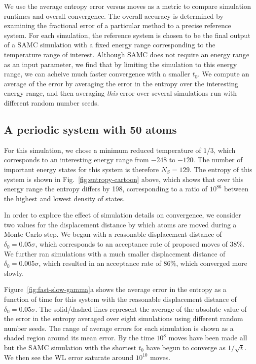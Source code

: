 \documentclass[letterpaper,twocolumn,amsmath,amssymb,pre,aps,10pt]{revtex4-1}
\begin{document}
We use the average entropy error versus moves as a metric to compare
simulation runtimes and overall convergence. The overall accuracy
is determined by examining the fractional error of a particular method to
a precise reference system. For each simulation, the reference system
is chosen to be the final output of a SAMC simulation with a fixed energy range
corresponding to the temperature range of interest.
Although SAMC does not require an energy range as an input parameter,
we find that by limiting the simulation to this energy range, we can
acheive much faster convergence with a smaller $t_0$.  We compute an average
of the error by averaging the error in the entropy over the
interesting energy range, and then averaging \emph{this} error over several
simulations run with different random number seeds.

\subsection{A periodic system with 50 atoms}

For this simulation, we chose a minimum reduced
temperature of $1/3$, which corresponds to an interesting energy range
from $-248$ to $-120$.  The number of important energy states
for this system is therefore $N_S = 129$.  The entropy of this system is shown in
Fig.~\ref{fig:entropy-cartoon} above, which shows that over this
energy range the entropy differs by 198, corresponding to a ratio of
$10^{86}$ between the highest and lowest density of states.

In order to explore the effect of simulation details on convergence,
we consider two values for the displacement distance by which atoms
are moved during a Monte Carlo step.  We began with a reasonable
displacement distance of $\delta_0 = 0.05\sigma$, which corresponds to
an acceptance rate of proposed moves of 38\%.  We further ran
simulations with a much smaller displacement distance of $\delta_0 =
0.005\sigma$, which resulted in an acceptance rate of 86\%, which
converged more slowly.

Figure~\ref{fig:fast-slow-gamma}a shows the average error in the
entropy as a function of time for this system with the reasonable
displacement distance of $\delta_0 = 0.05\sigma$.  The solid/dashed lines
represent the average of the absolute value of the error in the
entropy averaged over eight simulations using different random number
seeds.  The range of average errors for each simulation is shown as a
shaded region around its mean error.  By the time $10^8$ moves have
been made all but the SAMC simulation with the shortest $t_0$ have
begun to converge as $1/\sqrt{t}$.  We then see the WL error
saturate around $10^{10}$ moves.
\end{document}
